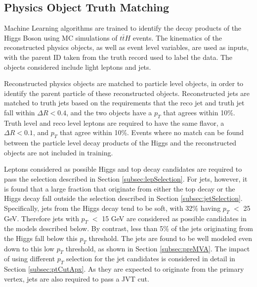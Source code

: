 \subsection{Physics Object Truth Matching}
\label{sec:truthLevelReco}

Machine Learning algorithms are trained to identify the decay products of the Higgs Boson using MC simulations of $t\bar{t}H$ events. The kinematics of the reconstructed physics objects, as well as event level variables, are used as inputs, with the parent ID taken from the truth record used to label the data. The objects considered include light leptons and jets. 

Reconstructed physics objects are matched to particle level objects, in order to identify the parent particle of these reconstructed objects. Reconstructed jets are matched to truth jets based on the requirements that the reco jet and truth jet fall within $\Delta R < 0.4$, and the two objects have a $p_T$ that agrees within 10\%. Truth level and reco level leptons are required to have the same flavor, a $\Delta R < 0.1$, and $p_T$ that agree within 10\%. Events where no match can be found between the particle level decay products of the Higgs and the reconstructed objects are not included in training.


Leptons considered as possible Higgs and top decay candidates are required to pass the selection described in Section \ref{subsec:lepSelection}. For jets, however, it is found that a large fraction that originate from either the top decay or the Higgs decay fall outside the selection described in Section \ref{subsec:jetSelection}. Specifically, jets from the Higgs decay tend to be soft, with 32\% having $p_T$ $<$ 25 GeV. Therefore jets with $p_T$ $<$ 15 GeV are considered as possible candidates in the models described below. By contrast, less than 5\% of the jets originating from the Higgs fall below this $p_T$ threshold. The jets are found to be well modeled even down to this low $p_T$ threshold, as shown in Section \ref{subsec:preMVA}. The impact of using different $p_T$ selection for the jet candidates is considered in detail in Section \ref{subsec:ptCutApx}. As they are expected to originate from the primary vertex, jets are also required to pass a JVT cut.

